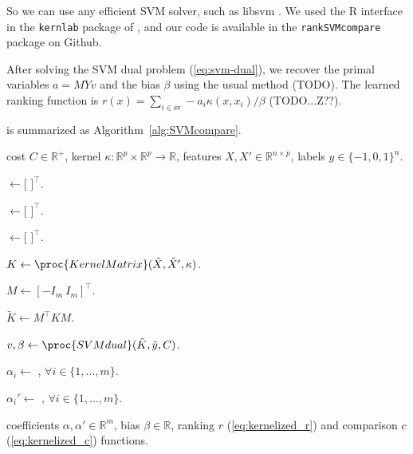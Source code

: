 \documentclass{article}
\newcommand{\RR}{\mathbb R}
\begin{document}
So we can use any efficient SVM solver, such as libsvm
\citep{libsvm}. We used the R interface in the \texttt{kernlab}
package of \citet{kernlab}, and our code is available in the
\texttt{rankSVMcompare} package on Github.

After solving the SVM dual problem (\ref{eq:svm-dual}), we recover the
primal variables $a = MYv$ and the bias $\beta$ using the usual method
(TODO). The learned ranking function is $r(x) = \sum_{i\in\text{sv}}
-a_i \kappa(x, x_i)/\beta$ (TODO...Z??).

 is summarized as Algorithm~\ref{alg:SVMcompare}.

\begin{algorithm}[b!]
   \caption{}
   \label{alg:SVMcompare}
\begin{algorithmic}
   cost $C\in\RR^+$, kernel
  $\kappa:\RR^p\times \RR^p \rightarrow \RR$, features $X,X'\in\RR^{n \times p}$,
  labels $y\in\{-1,0,1\}^n$.

  \STATE {} $\gets [$
  $]^\intercal$.

  \STATE {} $\gets [$
  $]^\intercal$.

  \STATE {} $\gets [$
  $]^\intercal$.

  \STATE $K \gets \proc{KernelMatrix}(\tilde X, \tilde X', \kappa)$.

  \STATE $M \gets [ -I_m\ I_m ]^\intercal$.

  \STATE $\tilde K \gets M^\intercal K M$.

  \STATE $v,\beta \gets \proc{SVMdual}(\tilde K, \tilde y, C)$.

  \STATE $\alpha_i \gets $ 
  ,
  $\forall i\in\{1,\dots, m\}$.

  \STATE $\alpha_i' \gets $
  ,
  $\forall i\in\{1,\dots, m\}$.

   coefficients $\alpha,\alpha'\in\RR^{m}$,
  bias $\beta\in\RR$, ranking $r$ (\ref{eq:kernelized_r}) and
  comparison $c$ (\ref{eq:kernelized_c}) functions.

   \end{algorithmic}
\end{algorithm}
\end{document}
